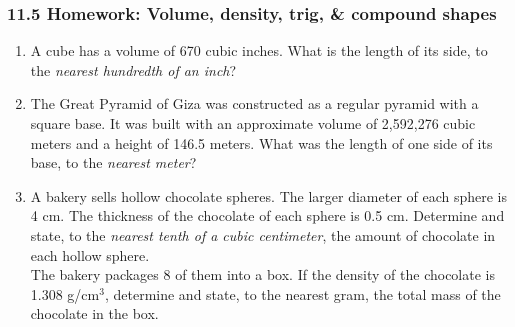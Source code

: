 \documentclass[12pt, twoside]{article}
\begin{document}
\subsubsection*{11.5 Homework: Volume, density, trig, \& compound shapes}
 \begin{enumerate}
  \item A cube has a volume of 670 cubic inches. What is the length of its side, to the \emph{nearest hundredth of an inch}? \vspace{3cm}

  \item The Great Pyramid of Giza was constructed as a regular pyramid with a square base. It was built with an approximate volume of 2,592,276 cubic meters and a height of 146.5 meters. What was the length of one side of its base, to the \emph{nearest meter}? \vspace{5cm}

  \item A bakery sells hollow chocolate spheres. The larger diameter of each sphere is 4 cm. The thickness of the chocolate of each sphere is 0.5 cm. Determine and state, to the \emph{nearest tenth of a cubic centimeter}, the amount of chocolate in each hollow sphere.\\[4.5cm]
  The bakery packages 8 of them into a box. If the density of the chocolate is 1.308 g/$\mathrm{cm}^3$, determine and state, to the nearest gram, the total mass of the chocolate in the box.



\end{enumerate}
\end{document}

